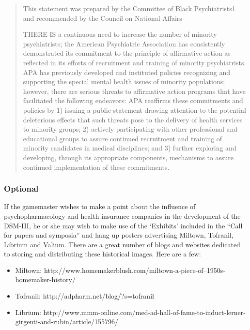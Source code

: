 \begin{refsection}
\begin{quote}
This statement was prepared by the Committee of Black Psychiatrists1 and recommended by the Council on National Affairs 

THERE IS a continuous need to increase the number of minority psychiatrists; the American Psychiatric Association has consistently demonstrated its commitment to the principle of affirmative action as reflected in its efforts of recruitment and training of minority psychiatrists. APA has previously developed and instituted policies recognizing and supporting the special mental health issues of minority populations; however, there are serious threats to affirmative action programs that have facilitated the following endeavors: APA reaffirms these commitments and policies by 1) issuing a public statement drawing attention to the potential deleterious effects that such threats pose to the delivery of health services to minority groups; 2) actively participating with other professional and educational groups to assure continued recruitment and training of minority candidates in medical disciplines; and 3) further exploring and developing, through its appropriate components, mechanisms to assure continued implementation of these commitments. 
\end{quote}

\subsubsection{Optional}
\label{optional}

If the gamemaster wishes to make a point about the influence of psychopharmacology and health insurance companies in the development of the DSM-III, he or she may wish to make use of the `Exhibits' included in the ``Call for papers and symposia'' and hang up posters advertising Miltown, Tofranil, Librium and Valium. There are a great number of blogs and websites dedicated to storing and distributing these historical images. Here are a few:

\begin{itemize}
\item Miltown: http:\slash \slash www.homemakerblush.com\slash miltown-a-piece-of--1950s-homemaker-history\slash 

\item Tofranil: http:\slash \slash adpharm.net\slash blog\slash ?s=tofranil

\item Librium: http:\slash \slash www.mmm-online.com\slash med-ad-hall-of-fame-to-induct-lerner-girgenti-and-rubin\slash article\slash 155796\slash 


\end{itemize}
\end{refsection}
